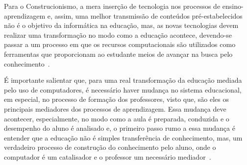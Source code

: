 
Para o Construcionismo, a mera inserção de tecnologia nos processos de ensino-aprendizagem e, assim, uma melhor transmissão de conteúdos pré-estabelecidos não é o objetivo da informática na educação, mas, as novas tecnologias devem realizar uma transformação no modo como a educação acontece, devendo-se passar a um processo em que os recursos computacionais são utilizados como ferramentas que proporcionam ao estudante meios de avançar na busca pelo conhecimento~\citep{Almeida:2000}.

É importante salientar que, para uma real transformação da educação mediada pelo uso de computadores, é necessário haver mudança no sistema educacional, em especial, no processo de formação dos professores, visto que, são eles os principais mediadores dos processos de aprendizagem. Essa mudança deve acontecer, especialmente, no modo como a aula é preparada, conduzida e o desempenho do aluno é analisado e, o primeiro passo rumo a essa mudança é entender que a educação não é simples transferência de conhecimento, mas, um verdadeiro processo de construção do conhecimento pelo aluno, onde o computador é um catalisador e o professor um necessário mediador~\citep{Valente:1993}.






